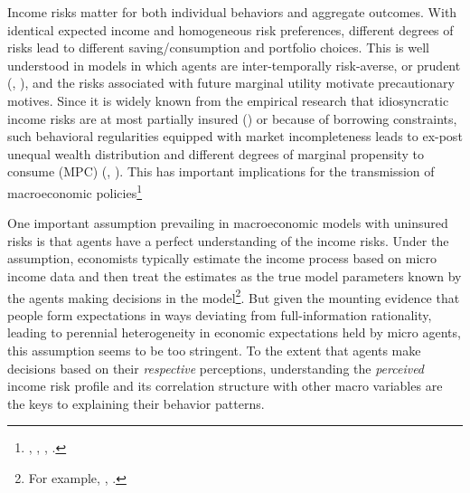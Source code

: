 \documentclass[12pt,notitlepage,onecolumn,aps,pra]{article}
\begin{document}
Income risks matter for both individual behaviors and aggregate
outcomes. With identical expected income and homogeneous risk
preferences, different degrees of risks lead to different
saving/consumption and portfolio choices. This is well understood in
models in which agents are inter-temporally risk-averse, or prudent
(\cite{kimball1990precautionary}, \cite{carroll2001liquidity}), and the
risks associated with future marginal utility motivate precautionary
motives. Since it is widely known from the empirical research that
idiosyncratic income risks are at most partially insured
(\cite{blundell_consumption_2008}) or because of borrowing constraints,
such behavioral regularities equipped with market incompleteness leads
to ex-post unequal wealth distribution and different degrees of marginal
propensity to consume (MPC) (\cite{huggett1993risk},
\cite{aiyagari1994uninsured}). This has important implications for the
transmission of macroeconomic
policies\footnote{\cite{krueger2016macroeconomics}, \cite{kaplan2018monetary}, \cite{auclert2019monetary}, \cite{bayer2019precautionary}.}

One important assumption prevailing in macroeconomic models with
uninsured risks is that agents have a perfect understanding of the
income risks. Under the assumption, economists typically estimate the
income process based on micro income data and then treat the estimates
as the true model parameters known by the agents making decisions in the
model\footnote{For example, \cite{krueger2016macroeconomics}, \cite{bayer2019precautionary}.}.
But given the mounting evidence that people form expectations in ways
deviating from full-information rationality, leading to perennial
heterogeneity in economic expectations held by micro agents, this
assumption seems to be too stringent. To the extent that agents make
decisions based on their \emph{respective} perceptions, understanding
the \emph{perceived} income risk profile and its correlation structure
with other macro variables are the keys to explaining their behavior
patterns.
\end{document}
